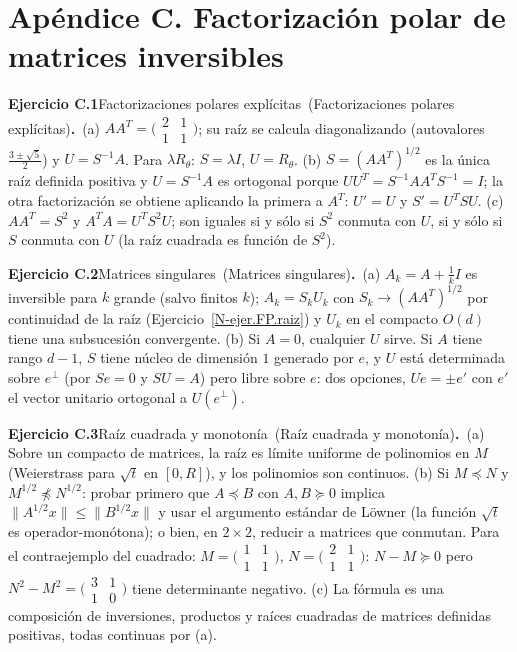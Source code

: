 \documentclass[11pt,a4paper]{amsart}
\theoremstyle{remark}
\theoremstyle{definition}
\numberwithin{subsection}{section}
\numberwithin{equation}{section}
\newcommand{\ejlabel}[2]{\par\medskip\noindent\textbf{Ejercicio #1}\ifx\relax#2\relax\else\ (#2)\fi\textbf{.}\ }
\begin{document}
\section*{Apéndice C. Factorización polar de matrices inversibles}
\ejlabel{C.1}{Factorizaciones polares explícitas}(a) $AA^T=\bigl(\begin{smallmatrix}2&1\\1&1\end{smallmatrix}\bigr)$; su raíz se calcula diagonalizando (autovalores $\frac{3\pm\sqrt5}2$) y $U=S^{-1}A$. Para $\lambda R_\theta$: $S=\lambda I$, $U=R_\theta$. (b) $S=(AA^T)^{1/2}$ es la única raíz definida positiva y $U=S^{-1}A$ es ortogonal porque $UU^T=S^{-1}AA^TS^{-1}=I$; la otra factorización se obtiene aplicando la primera a $A^T$: $U'=U$ y $S'=U^TSU$. (c) $AA^T=S^2$ y $A^TA=U^TS^2U$; son iguales si y sólo si $S^2$ conmuta con $U$, si y sólo si $S$ conmuta con $U$ (la raíz cuadrada es función de $S^2$).

\ejlabel{C.2}{Matrices singulares}(a) $A_k=A+\frac1kI$ es inversible para $k$ grande (salvo finitos $k$); $A_k=S_kU_k$ con $S_k\to(AA^T)^{1/2}$ por continuidad de la raíz (Ejercicio~\ref{N-ejer.FP.raiz}) y $U_k$ en el compacto $O(d)$ tiene una subsucesión convergente. (b) Si $A=0$, cualquier $U$ sirve. Si $A$ tiene rango $d-1$, $S$ tiene núcleo de dimensión $1$ generado por $e$, y $U$ está determinada sobre $e^\perp$ (por $Se=0$ y $SU=A$) pero libre sobre $e$: dos opciones, $Ue=\pm e'$ con $e'$ el vector unitario ortogonal a $U(e^\perp)$.

\ejlabel{C.3}{Raíz cuadrada y monotonía}(a) Sobre un compacto de matrices, la raíz es límite uniforme de polinomios en $M$ (Weierstrass para $\sqrt t$ en $[0,R]$), y los polinomios son continuos. (b) Si $M\preceq N$ y $M^{1/2}\not\preceq N^{1/2}$: probar primero que $A\preceq B$ con $A,B\succeq0$ implica $\|A^{1/2}x\|\le\|B^{1/2}x\|$ y usar el argumento estándar de Löwner (la función $\sqrt t$ es operador-monótona); o bien, en $2\times2$, reducir a matrices que conmutan. Para el contraejemplo del cuadrado: $M=\bigl(\begin{smallmatrix}1&1\\1&1\end{smallmatrix}\bigr)$, $N=\bigl(\begin{smallmatrix}2&1\\1&1\end{smallmatrix}\bigr)$: $N-M\succeq0$ pero $N^2-M^2=\bigl(\begin{smallmatrix}3&1\\1&0\end{smallmatrix}\bigr)$ tiene determinante negativo. (c) La fórmula es una composición de inversiones, productos y raíces cuadradas de matrices definidas positivas, todas continuas por (a).
\end{document}
